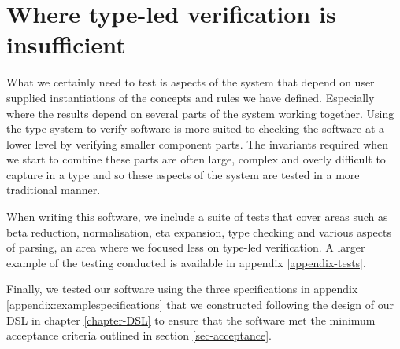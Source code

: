 \section{Where type-led verification is insufficient}

What we certainly need to test is aspects of the system that depend on
user supplied instantiations of the concepts and rules we have
defined. Especially where the results depend on several parts of the
system working together. Using the type system to verify software is
more suited to checking the software at a lower level by verifying
smaller component parts. The invariants required when we start to
combine these parts are often large, complex and overly difficult to
capture in a type and so these aspects of the system are tested in a
more traditional manner.

When writing this software, we include a suite of tests that cover
areas such as beta reduction, normalisation, eta expansion, type
checking and various aspects of parsing, an area where we
focused less on type-led verification. A larger example of the testing
conducted is available in appendix \ref{appendix-tests}.

Finally, we tested our software using the three specifications in
appendix \ref{appendix:examplespecifications} that we constructed
following the design of our DSL in chapter \ref{chapter-DSL} to ensure
that the software met the minimum acceptance criteria outlined in
section \ref{sec-acceptance}.
